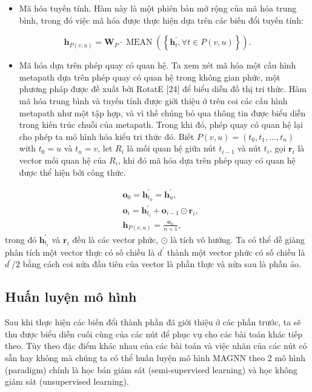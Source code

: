 \begin{itemize}
  \item Mã hóa tuyến tính. Hàm này là một phiên bản mở rộng của mã hóa trung bình, trong đó việc mã hóa được thực hiện dựa trên các biến đổi tuyến tính:
\end{itemize}
\begin{equation}
    \mathbf{h}_{P(v, u)}=\mathbf{W}_{P} \cdot \operatorname{MEAN}\left(\left\{\mathbf{h}_{t}^{\prime}, \forall t \in P(v, u)\right\}\right).
\end{equation}

\begin{itemize}
  \item Mã hóa dựa trên phép quay có quan hệ. Ta xem xét mã hóa một cấu hình metapath dựa trên phép quay có quan hệ trong không gian phức, một phương pháp được đề xuất bởi RotatE [24] để biểu diễn đồ thị tri thức. Hàm mã hóa trung bình và tuyến tính được giới thiệu ở trên coi các cấu hình metapath như một tập hợp, và vì thế chúng bỏ qua thông tin được biểu diễn trong kiến trúc chuỗi của metapath. Trong khi đó, phép quay có quan hệ lại cho phép ta mô hình hóa kiểu tri thức đó. Biết $P(v, u)=\left(t_{0}, t_{1}, \ldots, t_{n}\right)$ with $t_{0}=u$ và $t_{n}=v$, let $R_{i}$ là mối quan hệ giữa nút  $t_{i-1}$ và nút $t_{i}$, gọi $\mathbf{r}_{i}$ là vector mối quan hệ của $R_{i}$, khi đó mã hóa dựa trên phép quay có quan hệ được thể hiện bởi công thức.
\end{itemize}
\begin{equation}
    \begin{aligned}
    & \mathbf{o}_{0}=\mathbf{h}_{t_{0}}^{\prime}=\mathbf{h}_{u}^{\prime}, \\
    & \mathbf{o}_{i}=\mathbf{h}_{t_{i}}^{\prime}+\mathbf{o}_{i-1} \odot \mathbf{r}_{i}, \\
    & \mathbf{h}_{P(v, u)}=\frac{\mathbf{o}_{n}}{n+1},
    \end{aligned}
\end{equation}
trong đó  $\mathbf{h}_{t_{i}}^{\prime}$ và $\mathbf{r}_{i}$ đều là các vector phức, $\odot$ là tích vô hướng. Ta có thể dễ giàng phân tích một vector thực có số chiều là $d^{\prime}$ thành một vector phức có số chiều là $d^{\prime} / 2$ bằng cách coi nửa đầu tiên của vector là phần thực và nửa sau là phần ảo.

\subsection{Huấn luyện mô hình}
Sau khi thực hiện các biến đổi thành phần đã giới thiệu ở các phần trước, ta sẽ thu được biểu diễn cuối cùng của các nút để phục vụ cho các bài toán khác tiếp theo. Tùy theo đặc điểm khác nhau của các bài toán và việc nhãn của các nút có sẵn hay không mà chúng ta có thể huấn luyện mô hình MAGNN theo 2 mô hình (paradigm) chính là học bán giám sát (semi-supervised learning) và học không giám sát (unsupervised learning).

